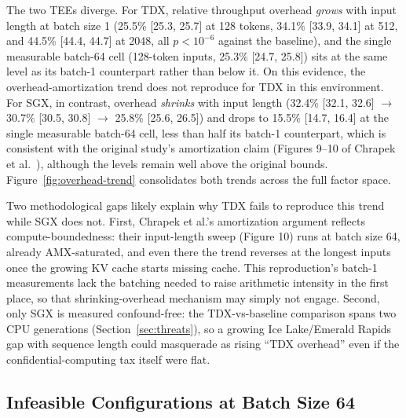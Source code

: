 \documentclass[sigconf]{acmart}
\begin{document}
The two TEEs diverge. For TDX, relative throughput overhead \emph{grows} with input
length at batch size 1 (25.5\% [25.3, 25.7] at 128 tokens, 34.1\% [33.9, 34.1] at 512,
and 44.5\% [44.4, 44.7] at 2048, all $p < 10^{-6}$ against the baseline), and the single
measurable batch-64 cell (128-token inputs, 25.3\% [24.7, 25.8]) sits at the same level
as its batch-1 counterpart rather than below it. On this evidence, the
overhead-amortization trend does not reproduce for TDX in this environment. For SGX, in
contrast, overhead \emph{shrinks} with input length (32.4\% [32.1, 32.6]
$\rightarrow$ 30.7\% [30.5, 30.8] $\rightarrow$ 25.8\% [25.6, 26.5]) and drops to 15.5\%
[14.7, 16.4] at the single measurable batch-64 cell, less than half its batch-1
counterpart, which is consistent with the original study's amortization claim (Figures
9--10 of Chrapek et al.~\cite{chrapek2025confidential}), although the levels remain
well above the original bounds. Figure~\ref{fig:overhead-trend} consolidates both
trends across the full factor space.

Two methodological gaps likely explain why TDX fails to reproduce this trend while SGX
does not. First, Chrapek et al.'s amortization argument reflects compute-boundedness:
their input-length sweep (Figure 10) runs at batch size 64, already AMX-saturated, and
even there the trend reverses at the longest inputs once the growing KV cache starts
missing cache. This reproduction's batch-1 measurements lack the batching needed to
raise arithmetic intensity in the first place, so that shrinking-overhead mechanism may
simply not engage. Second, only SGX is measured confound-free: the TDX-vs-baseline
comparison spans two CPU generations (Section~\ref{sec:threats}), so a growing Ice
Lake/Emerald Rapids gap with sequence length could masquerade as rising ``TDX
overhead'' even if the confidential-computing tax itself were flat.

\subsection{Infeasible Configurations at Batch Size 64}
\label{sec:oom}
\end{document}
